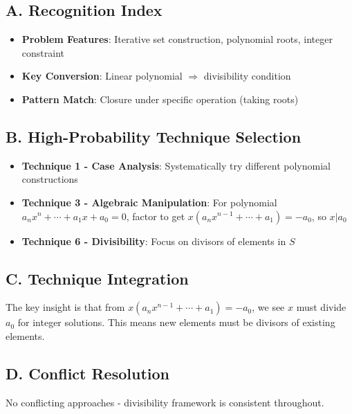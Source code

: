 \documentclass[12pt]{article}
\begin{document}
\begin{conversionbox}
\subsection*{A. Recognition Index}
\begin{itemize}[leftmargin=*]
    \item \textbf{Problem Features}: Iterative set construction, polynomial roots, integer constraint
    \item \textbf{Key Conversion}: Linear polynomial $\Rightarrow$ divisibility condition
    \item \textbf{Pattern Match}: Closure under specific operation (taking roots)
\end{itemize}

\subsection*{B. High-Probability Technique Selection}
\begin{itemize}[leftmargin=*]
    \item \textbf{Technique 1 - Case Analysis}: Systematically try different polynomial constructions
    \item \textbf{Technique 3 - Algebraic Manipulation}: For polynomial $a_nx^n + \cdots + a_1x + a_0 = 0$, factor to get $x(a_nx^{n-1} + \cdots + a_1) = -a_0$, so $x | a_0$
    \item \textbf{Technique 6 - Divisibility}: Focus on divisors of elements in $S$
\end{itemize}

\subsection*{C. Technique Integration}
The key insight is that from $x(a_nx^{n-1} + \cdots + a_1) = -a_0$, we see $x$ must divide $a_0$ for integer solutions. This means new elements must be divisors of existing elements.

\subsection*{D. Conflict Resolution}
No conflicting approaches - divisibility framework is consistent throughout.
\end{conversionbox}
\end{document}
